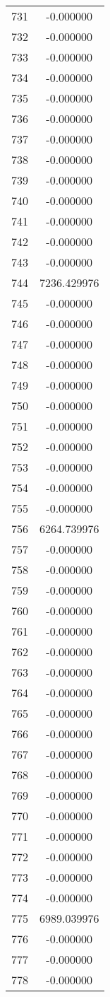 \documentclass[12pt]{article}
\begin{document}
\begin{longtable}{@{}cc@{}}
731 & -0.000000 \\
732 & -0.000000 \\
733 & -0.000000 \\
734 & -0.000000 \\
735 & -0.000000 \\
736 & -0.000000 \\
737 & -0.000000 \\
738 & -0.000000 \\
739 & -0.000000 \\
740 & -0.000000 \\
741 & -0.000000 \\
742 & -0.000000 \\
743 & -0.000000 \\
744 & 7236.429976 \\
745 & -0.000000 \\
746 & -0.000000 \\
747 & -0.000000 \\
748 & -0.000000 \\
749 & -0.000000 \\
750 & -0.000000 \\
751 & -0.000000 \\
752 & -0.000000 \\
753 & -0.000000 \\
754 & -0.000000 \\
755 & -0.000000 \\
756 & 6264.739976 \\
757 & -0.000000 \\
758 & -0.000000 \\
759 & -0.000000 \\
760 & -0.000000 \\
761 & -0.000000 \\
762 & -0.000000 \\
763 & -0.000000 \\
764 & -0.000000 \\
765 & -0.000000 \\
766 & -0.000000 \\
767 & -0.000000 \\
768 & -0.000000 \\
769 & -0.000000 \\
770 & -0.000000 \\
771 & -0.000000 \\
772 & -0.000000 \\
773 & -0.000000 \\
774 & -0.000000 \\
775 & 6989.039976 \\
776 & -0.000000 \\
777 & -0.000000 \\
778 & -0.000000 \\

\end{longtable}
\end{document}
